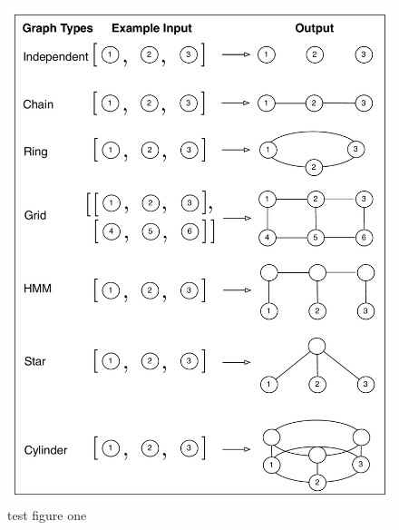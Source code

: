 \documentclass{article} %
\begin{document}
\begin{figure}
\begin{minipage}[c][8cm][t]{.4\textwidth}
  \vspace*{\fill}
  \includegraphics[width=\linewidth]{./figures/tasks.pdf}
  \caption{test figure one}
  \label{fig:test1}
\end{minipage}%
\begin{minipage}[c][8cm][t]{.3\textwidth}
  \vspace*{\fill}

\end{minipage}
\end{figure}
\end{document}
